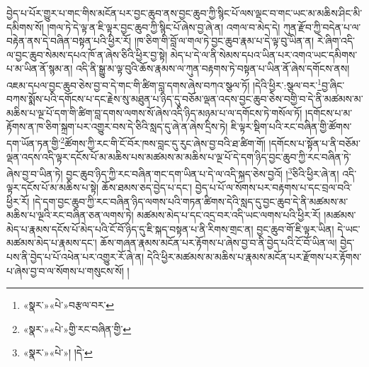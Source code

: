 བྱེད་པ་པོར་གྱུར་པ་གང་གིས་མངོན་པར་བྱང་ཆུབ་ནས་བྱང་ཆུབ་ཀྱི་སྙིང་པོ་ལས་ལྡང་བ་གང་ཡང་མ་མཆིས་ཤིང་མི་དམིགས་སོ། །གལ་ཏེ་དེ་ལྟ་ན་ཇི་ལྟར་བྱང་ཆུབ་ཀྱི་སྙིང་པོ་ཞེས་བྱ་ཞེ་ན། འགལ་བ་མེད་དེ། ཀུན་རྫོབ་ཀྱི་བདེན་པ་ལ་བརྟེན་ནས་དེ་བཞིན་བསྟན་པའི་ཕྱིར་རོ། །ཁ་ཅིག་གི་བློ་ལ་གལ་ཏེ་བྱང་ཆུབ་རྣམ་པ་དེ་ལྟ་བུ་ཡིན་ན། རེ་ཞིག་འདི་ལ་བྱང་ཆུབ་སེམས་དཔའ་ཁོ་ན་ཞེས་ཅིའི་ཕྱིར་བྱ་སྟེ། མེད་པ་དེ་ལ་ནི་སེམས་དཔའ་ཡིན་པར་འགའ་ཡང་དམིགས་པ་མ་ཡིན་ནོ་སྙམ་ན། འདི་ནི་སྒྱུ་མ་ལྟ་བུའི་ཆོས་རྣམས་ལ་ཀུན་བརྟགས་ཏེ་བསྟན་པ་ཡིན་ནོ་ཞེས་དགོངས་ནས། འཇམ་དཔལ་བྱང་ཆུབ་ཅེས་བྱ་བ་དེ་གང་གི་ཚིག་བླ་དགས་ཞེས་བཀའ་སྩལ་ཏོ། །དེའི་ཕྱིར་:སྩལ་བར་\footnote{«སྣར་»«པེ་»བརྩལ་བར་}བྱ་ཞིང་བཀས་སྨོས་པའི་དགོངས་པ་དང་རྗེས་སུ་མཐུན་པ་ཉིད་དུ་བཅོམ་ལྡན་འདས་བྱང་ཆུབ་ཅེས་བགྱི་བ་དེ་ནི་མཚམས་མ་མཆིས་པ་ལྔ་པོ་དག་གི་ཚིག་བླ་དགས་ལགས་སོ་ཞེས་འདི་ཉིད་མཉམ་པ་ལ་དགོངས་ཏེ་གསོལ་ཏོ། །དགོངས་པ་མ་རྟོགས་ན་ཁ་ཅིག་སྐྲག་པར་འགྱུར་བས་དེ་ཅིའི་སླད་དུ་ཞེ་ན་ཞེས་དྲིས་ཏེ། ཇི་ལྟར་སྡིག་པའི་རང་བཞིན་གྱི་ཚོགས་དག་ཡོན་ཏན་གྱི་\footnote{«སྣར་»«པེ་»གྱི་རང་བཞིན་གྱི་}ཚོགས་ཀྱི་རང་གི་ངོ་བོར་ཁས་བླང་དུ་རུང་ཞེས་བྱ་བའི་ཐ་ཚིག་གོ། །དགོངས་པ་སྟོན་པ་ནི་བཅོམ་ལྡན་འདས་འདི་ལྟར་དངོས་པོ་མ་མཆིས་པས་མཚམས་མ་མཆིས་པ་ལྔ་པོ་དེ་དག་ཉིད་བྱང་ཆུབ་ཀྱི་རང་བཞིན་ཏེ་ཞེས་བྱ་བ་ཡིན་ཏེ། བྱང་ཆུབ་ཉིད་ཀྱི་རང་བཞིན་གང་དག་ཡིན་པ་དེ་ལ་འདི་སྐད་ཅེས་བྱའོ། །\footnote{«སྣར་»«པེ་»། །དེ་}ཅིའི་ཕྱིར་ཞེ་ན། འདི་ལྟར་དངོས་པོ་མ་མཆིས་པ་སྟེ། ཆོས་ཐམས་ཅད་བྱེད་པ་དང་། བྱེད་པ་པོ་ལ་སོགས་པར་བརྟགས་པ་དང་བྲལ་བའི་ཕྱིར་རོ། །དེ་དག་བྱང་ཆུབ་ཀྱི་རང་བཞིན་ཉིད་ལགས་པའི་གཏན་ཚིགས་དེའི་སླད་དུ་བྱང་ཆུབ་དེ་ནི་མཚམས་མ་མཆིས་པ་ལྔའི་རང་བཞིན་ཅན་ལགས་ཏེ། མཚམས་མེད་པ་དང་འདྲ་བར་འདི་ཡང་ལགས་པའི་ཕྱིར་རོ། །མཚམས་མེད་པ་རྣམས་དངོས་པོ་མེད་པའི་ངོ་བོ་ཉིད་དུ་ཇི་སྐད་བསྟན་པ་ནི་རིགས་གྲང་ན། བྱང་ཆུབ་གོ་ཇི་ལྟར་ཡིན། དེ་ཡང་མཚམས་མེད་པ་རྣམས་དང་། ཆོས་གཞན་རྣམས་མངོན་པར་རྟོགས་པ་ཞེས་བྱ་བ་ནི་བྱེད་པའི་ངོ་བོ་ཡིན་ལ། བྱེད་པས་ནི་བྱེད་པ་པོ་འཕེན་པར་འགྱུར་རོ་ཞེ་ན། དེའི་ཕྱིར་མཚམས་མ་མཆིས་པ་རྣམས་མངོན་པར་རྫོགས་པར་རྟོགས་པ་ཞེས་བྱ་བ་ལ་སོགས་པ་གསུངས་སོ། །
